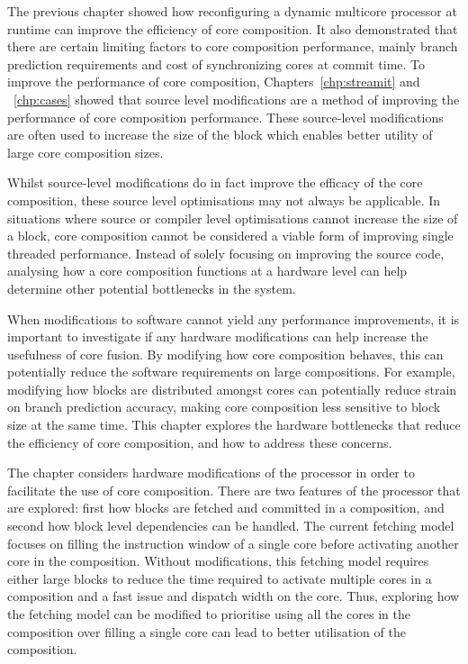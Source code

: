 The previous chapter showed how reconfiguring a dynamic multicore processor at runtime can improve the efficiency of core composition.
It also demonstrated that there are certain limiting factors to core composition performance, mainly branch prediction requirements and cost of synchronizing cores at commit time.
To improve the performance of core composition, Chapters~\ref{chp:streamit} and ~\ref{chp:cases} showed that source level modifications are a method of improving the performance of core composition performance.
These source-level modifications are often used to increase the size of the block which enables better utility of large core composition sizes.

Whilst source-level modifications do in fact improve the efficacy of the core composition, these source level optimisations may not always be applicable.
In situations where source or compiler level optimisations cannot increase the size of a block, core composition cannot be considered a viable form of improving single threaded performance.
Instead of solely focusing on improving the source code, analysing how a core composition functions at a hardware level can help determine other potential bottlenecks in the system.

When modifications to software cannot yield any performance improvements, it is important to investigate if any hardware modifications can help increase the usefulness of core fusion.
By modifying how core composition behaves, this can potentially reduce the software requirements on large compositions.
For example, modifying how blocks are distributed amongst cores can potentially reduce strain on branch prediction accuracy, making core composition less sensitive to block size at the same time.
This chapter explores the hardware bottlenecks that reduce the efficiency of core composition, and how to address these concerns.

The chapter considers hardware modifications of the processor in order to facilitate the use of core composition.
There are two features of the processor that are explored: first how blocks are fetched and committed in a composition, and second how block level dependencies can be handled.
The current fetching model focuses on filling the instruction window of a single core before activating another core in the composition.
Without modifications, this fetching model requires either large blocks to reduce the time required to activate multiple cores in a composition and a fast issue and dispatch width on the core.
Thus, exploring how the fetching model can be modified to prioritise using all the cores in the composition over filling a single core can lead to better utilisation of the composition.

